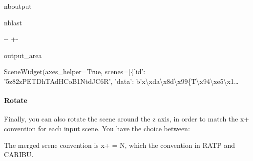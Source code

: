 \documentclass[letterpaper,10pt,english]{sphinxmanual}
\begin{document}
\begin{sphinxuseclass}{nboutput}
\begin{sphinxuseclass}{nblast}
{

\kern-\sphinxverbatimsmallskipamount\kern-\baselineskip
\kern+\FrameHeightAdjust\kern-\fboxrule
\vspace{\nbsphinxcodecellspacing}

\begin{sphinxuseclass}{output_area}
\begin{sphinxuseclass}{}


\begin{sphinxVerbatim}[commandchars=\\\{\}]
\llap{\color{nbsphinxout}[20]:\,\hspace{\fboxrule}\hspace{\fboxsep}}SceneWidget(axes\_helper=True, scenes=[\{'id': '5z82zPETDhTAdHCoB1NtdJC6R', 'data': b'x\textbackslash{}xda\textbackslash{}x8d\textbackslash{}x99\{T\textbackslash{}x94\textbackslash{}xe5\textbackslash{}x1…
\end{sphinxVerbatim}



\end{sphinxuseclass}
\end{sphinxuseclass}
}

\end{sphinxuseclass}
\end{sphinxuseclass}

\paragraph{Rotate}
\label{\detokenize{input_scenes:Rotate}}
\sphinxAtStartPar
Finally, you can also rotate the scene around the z axis, in order to match the x+ convention for each input scene. You have the choice between: \sphinxhyphen{}  \sphinxhyphen{}  \sphinxhyphen{}  \sphinxhyphen{} 

\sphinxAtStartPar
The merged scene convention is x+ = N, which the convention in RATP and CARIBU.
\end{document}
